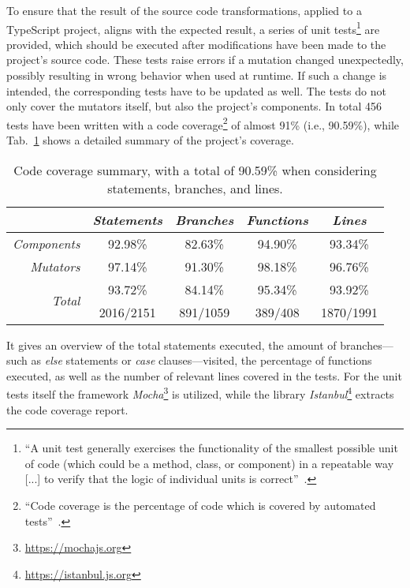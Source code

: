 To ensure that the result of the source code transformations, applied to a TypeScript project, aligns with the expected result, a series of unit tests\footnote{``A unit test generally exercises the functionality of the smallest possible unit of code (which could be a method, class, or component) in a repeatable way [...] to verify that the logic of individual units is correct''~\cite{UnitTests:Android}.} are provided, which should be executed after modifications have been made to the project's source code. These tests raise errors if a mutation changed unexpectedly, possibly resulting in wrong behavior when used at runtime. If such a change is intended, the corresponding tests have to be updated as well. The tests do not only cover the mutators itself, but also the project's components. In total 456 tests have been written with a code coverage\footnote{``Code coverage is the percentage of code which is covered by automated tests''~\cite{CodeCoverage:Atlassian}.} of almost 91\% (i.e., 90.59\%), while Tab.~\ref{tab:code-coverage} shows a detailed summary of the project's coverage.
\begin{table}[h]
\caption{Code coverage summary, with a total of 90.59\% when considering statements, branches, and lines.}
\label{tab:code-coverage}
\centering
\setlength{\tabcolsep}{5mm}
\def\arraystretch{1.25}
\small
\begin{tabular}{|r||c|c|c|c|}
    \hline
    & \emph{Statements} & \emph{Branches} & \emph{Functions} & \emph{Lines} \\
    \hline
    \hline
    \emph{Components} & 92.98\% & 82.63\% & 94.90\% & 93.34\% \\
    \hline
    \emph{Mutators} & 97.14\% & 91.30\% & 98.18\% & 96.76\% \\
    \hline
    \hline
    \multicolumn{1}{|r||}{\multirow{2}{*}{\emph{Total}}} & 93.72\% & 84.14\% & 95.34\% & 93.92\% \\
    \cline{2-5}
    \multicolumn{1}{|c||}{} & 2016/2151 & 891/1059 & 389/408 & 1870/1991 \\
    \hline
  \end{tabular}
\end{table}

\pagebreak
\noindent
It gives an overview of the total statements executed, the amount of branches---such as \emph{else} statements or \emph{case} clauses---visited, the percentage of functions executed, as well as the number of relevant lines covered in the tests. For the unit tests itself the framework \emph{Mocha}\footnote{\url{https://mochajs.org}} is utilized, while the library \emph{Istanbul}\footnote{\url{https://istanbul.js.org}} extracts the code coverage report.

